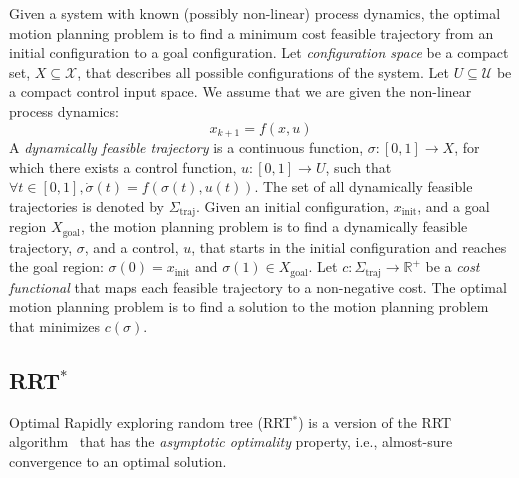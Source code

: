 \documentclass[letterpaper, 10pt, english, conference]{IEEEtran}
\begin{document}
Given a system with known (possibly non-linear) process dynamics, the
optimal motion planning problem is to find a minimum cost feasible
trajectory from an initial configuration to a goal configuration. Let
{\em configuration space} be a compact set, $X \subseteq \mathcal{X}$,
that describes all possible configurations of the system. Let $U
\subseteq \mathcal{U}$ be a compact control input space. We assume that we
are given the non-linear process dynamics:
\[
x_{k+1} = f(x,u)
\]
A {\em dynamically feasible trajectory} is a continuous function,
$\sigma: [0,1] \to X$, for which there exists a control function,
$u:[0,1] \to U$, such that $\forall t \in [0,1], \dot{\sigma}(t) =
f(\sigma(t),u(t))$. The set of all dynamically feasible trajectories
is denoted by $\Sigma_\mathrm{traj}$. Given an initial configuration,
$x_\mathrm{init}$, and a goal region $X_\mathrm{goal}$, the motion
planning problem is to find a dynamically feasible trajectory,
$\sigma$, and a control, $u$, that starts in the initial configuration
and reaches the goal region: $\sigma(0) = x_\mathrm{init}$ and
$\sigma(1) \in X_\mathrm{goal}$. Let $c : \Sigma_\mathrm{traj} \to
\mathbb{R}^+$ be a {\em cost functional} that maps each feasible
trajectory to a non-negative cost. The optimal motion planning problem
is to find a solution to the motion planning problem that minimizes
$c(\sigma)$.

\subsection{RRT$^*$}

Optimal Rapidly exploring random tree (RRT$^*$) \cite{karaman.frazzoli.ijrr11} is a version of the RRT algorithm~\cite{lavalle.kuffner.ijrr01} that has the \emph{asymptotic optimality} property, i.e., almost-sure convergence to an optimal solution.
\end{document}
